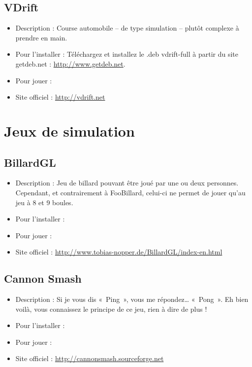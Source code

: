 \subsection{VDrift}
\begin{itemize}
\begingroup
{}
\item Description : Course automobile -- de type simulation -- plutôt complexe à prendre en main.{\par}
\item Pour l'installer : Téléchargez et installez le .deb vdrift-full à partir du site getdeb.net :
\url{http://www.getdeb.net}.{\par}
\item Pour jouer : 
\item Site officiel : \url{http://vdrift.net}{\par}
\endgroup
\end{itemize}
\section{Jeux de simulation}
\subsection{BillardGL}
\begin{itemize}
\begingroup
{}
\item Description : Jeu de billard pouvant être joué par une ou deux personnes. Cependant, et contrairement à FooBillard, celui-ci ne permet de jouer qu'au jeu à 8 et 9 boules.{\par}
\endgroup
\item Pour l'installer : 
\item Pour jouer : 
\item Site officiel : \url{http://www.tobias-nopper.de/BillardGL/index-en.html}{\par}
\end{itemize}
\subsection{Cannon Smash}
\begin{itemize}
\begingroup
{}
\item Description : Si je vous dis «~Ping~», vous me répondez\ldots{} «~Pong~». Eh bien voilà, vous connaissez le principe de ce jeu, rien à dire de plus !{\par}
\item Pour l'installer : 
\item Pour jouer : 
\endgroup
\item Site officiel : \url{http://cannonsmash.sourceforge.net}{\par}
\end{itemize}
